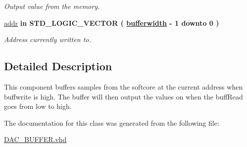 \begin{DoxyCompactItemize}
\begin{DoxyCompactList}\small\item\em Output value from the memory. \end{DoxyCompactList}\item 
\hypertarget{classDAC__buffer_a691d4d7a4daca8bfcaff715e9b7c5dbb}{\hyperlink{classDAC__buffer_a691d4d7a4daca8bfcaff715e9b7c5dbb}{addr}  {\bfseries {\bfseries \textcolor{vhdlkeyword}{in}\textcolor{vhdlchar}{ }}} {\bfseries \textcolor{comment}{S\-T\-D\-\_\-\-L\-O\-G\-I\-C\-\_\-\-V\-E\-C\-T\-O\-R}\textcolor{vhdlchar}{ }\textcolor{vhdlchar}{(}\textcolor{vhdlchar}{ }\textcolor{vhdlchar}{ }{\bfseries \hyperlink{classDAC__buffer_a2f94b7b31a8914ee23be5e000f89e921}{bufferwidth}} \textcolor{vhdlchar}{ }\textcolor{vhdlchar}{-\/}\textcolor{vhdlchar}{ } \textcolor{vhdldigit}{1} \textcolor{vhdlchar}{ }\textcolor{vhdlchar}{ }\textcolor{vhdlchar}{ }\textcolor{vhdlkeyword}{downto}\textcolor{vhdlchar}{ }\textcolor{vhdlchar}{ }\textcolor{vhdlchar}{ } \textcolor{vhdldigit}{0} \textcolor{vhdlchar}{ }\textcolor{vhdlchar}{)}\textcolor{vhdlchar}{ }} }\label{classDAC__buffer_a691d4d7a4daca8bfcaff715e9b7c5dbb}

\begin{DoxyCompactList}\small\item\em Address currently written to. \end{DoxyCompactList}\end{DoxyCompactItemize}


\subsection{Detailed Description}
This component buffers samples from the softcore at the current address when buffwrite is high. The buffer will then output the values on when the buff\-Read goes from low to high. 

The documentation for this class was generated from the following file\-:\begin{DoxyCompactItemize}
\item 
\hyperlink{DAC__BUFFER_8vhd}{D\-A\-C\-\_\-\-B\-U\-F\-F\-E\-R.\-vhd}\end{DoxyCompactItemize}
